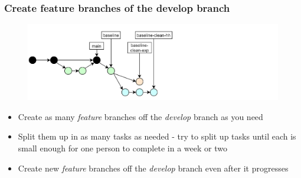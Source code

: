 \documentclass[aspectratio=169]{beamer} %
\begin{document}
\begin{frame}
	\frametitle{Create feature branches of the develop branch}

	\vspace{-.5cm}
	\begin{minipage}[t][5cm][t]{\textwidth}
		\begin{figure}
			\centering
			\includegraphics[width=\textwidth]{./img/dime-gitflow-network-2-2.png}
		\end{figure}
	\end{minipage}

	\vspace{-.5cm}
	\begin{minipage}[t][5cm][t]{\textwidth}
		\begin{itemize}
			\setlength\itemsep{.5em}
			\item Create as many \textit{feature} branches off the \textit{develop} branch as you need
			\item Split them up in as many tasks as needed - try to split up tasks until each is small enough for one person to complete in a week or two
			\item Create new \textit{feature} branches off the \textit{develop} branch even after it progresses
		\end{itemize}
	\end{minipage}
\end{frame}
\end{document}
